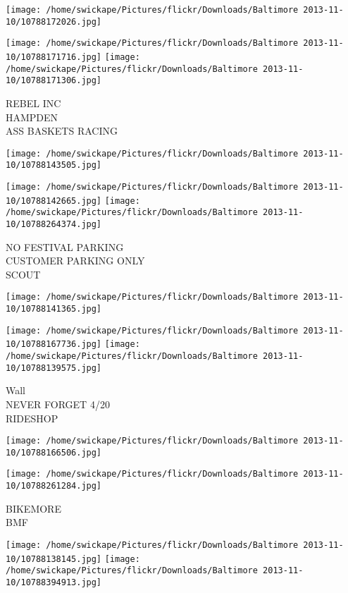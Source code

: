 \documentclass[10pt,letterpaper]{article}
\begin{document}
\texttt{[image: /home/swickape/Pictures/flickr/Downloads/Baltimore 2013-11-10/10788172026.jpg]}

\vspace{0.25in}
\texttt{[image: /home/swickape/Pictures/flickr/Downloads/Baltimore 2013-11-10/10788171716.jpg]}
\texttt{[image: /home/swickape/Pictures/flickr/Downloads/Baltimore 2013-11-10/10788171306.jpg]}

REBEL INC\\
HAMPDEN\\
ASS BASKETS RACING\\
\pagebreak

\texttt{[image: /home/swickape/Pictures/flickr/Downloads/Baltimore 2013-11-10/10788143505.jpg]}

\vspace{0.25in}
\texttt{[image: /home/swickape/Pictures/flickr/Downloads/Baltimore 2013-11-10/10788142665.jpg]}
\texttt{[image: /home/swickape/Pictures/flickr/Downloads/Baltimore 2013-11-10/10788264374.jpg]}

NO FESTIVAL PARKING\\
CUSTOMER PARKING ONLY\\
SCOUT\\
\pagebreak

\texttt{[image: /home/swickape/Pictures/flickr/Downloads/Baltimore 2013-11-10/10788141365.jpg]}

\vspace{0.25in}
\texttt{[image: /home/swickape/Pictures/flickr/Downloads/Baltimore 2013-11-10/10788167736.jpg]}
\texttt{[image: /home/swickape/Pictures/flickr/Downloads/Baltimore 2013-11-10/10788139575.jpg]}

Wall\\
NEVER FORGET 4/20\\
RIDESHOP\\
\pagebreak

\texttt{[image: /home/swickape/Pictures/flickr/Downloads/Baltimore 2013-11-10/10788166506.jpg]}

\vspace{0.25in}
\texttt{[image: /home/swickape/Pictures/flickr/Downloads/Baltimore 2013-11-10/10788261284.jpg]}

BIKEMORE\\
BMF\\
\pagebreak

\texttt{[image: /home/swickape/Pictures/flickr/Downloads/Baltimore 2013-11-10/10788138145.jpg]}
\texttt{[image: /home/swickape/Pictures/flickr/Downloads/Baltimore 2013-11-10/10788394913.jpg]}
\end{document}

